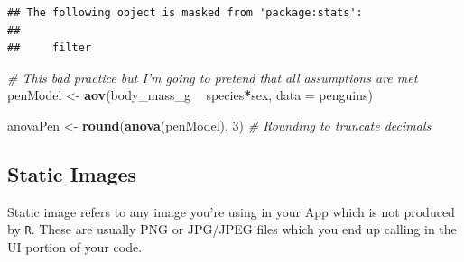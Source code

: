 \documentclass[
]{book}
\newenvironment{Shaded}{\begin{snugshade}}{\end{snugshade}}
\newcommand{\CommentTok}[1]{\textcolor[rgb]{0.56,0.35,0.01}{\textit{#1}}}
\newcommand{\DataTypeTok}[1]{\textcolor[rgb]{0.13,0.29,0.53}{#1}}
\newcommand{\DecValTok}[1]{\textcolor[rgb]{0.00,0.00,0.81}{#1}}
\newcommand{\KeywordTok}[1]{\textcolor[rgb]{0.13,0.29,0.53}{\textbf{#1}}}
\newcommand{\NormalTok}[1]{#1}
\newcommand{\OperatorTok}[1]{\textcolor[rgb]{0.81,0.36,0.00}{\textbf{#1}}}
\newcommand{\OtherTok}[1]{\textcolor[rgb]{0.56,0.35,0.01}{#1}}
\newcommand{\StringTok}[1]{\textcolor[rgb]{0.31,0.60,0.02}{#1}}
\begin{document}
\begin{verbatim}
## The following object is masked from 'package:stats':
## 
##     filter
\end{verbatim}

\begin{Shaded}
\begin{Highlighting}[]
\CommentTok{# This bad practice but I'm going to pretend that all assumptions are met}
\NormalTok{penModel <-}\StringTok{ }\KeywordTok{aov}\NormalTok{(body_mass_g }\OperatorTok{~}\StringTok{ }\NormalTok{species}\OperatorTok{*}\NormalTok{sex, }\DataTypeTok{data =}\NormalTok{ penguins)}

\NormalTok{anovaPen <-}\StringTok{ }\KeywordTok{round}\NormalTok{(}\KeywordTok{anova}\NormalTok{(penModel), }\DecValTok{3}\NormalTok{)}
\CommentTok{# Rounding to truncate decimals}
\end{Highlighting}
\end{Shaded}

\begin{Shaded}
\end{Shaded}

\hypertarget{static-images}{%
\subsection{Static Images}\label{static-images}}

Static image refers to any image you're using in your App which is not produced by \texttt{R}. These are usually PNG or JPG/JPEG files which you end up calling in the UI portion of your code.
\end{document}
